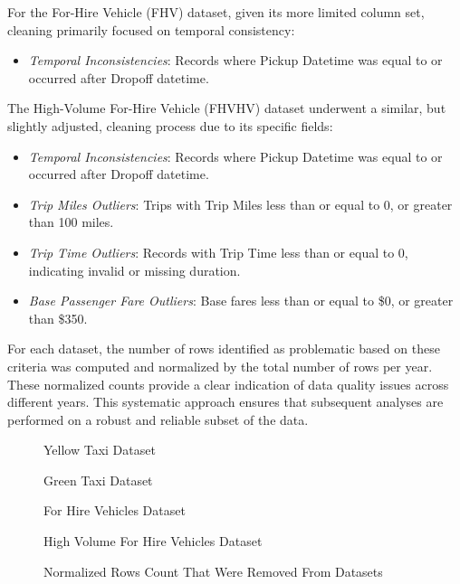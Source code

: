 \documentclass[conference]{IEEEtran}
\begin{document}
For the For-Hire Vehicle (FHV) dataset, given its more limited column set, cleaning primarily focused on temporal consistency:
\begin{itemize}
  \item \emph{Temporal Inconsistencies}: Records where Pickup Datetime was equal to or occurred after Dropoff datetime.
\end{itemize}

The High-Volume For-Hire Vehicle (FHVHV) dataset underwent a similar, but slightly adjusted, cleaning process due to its
specific fields:
\begin{itemize}
  \item \emph{Temporal Inconsistencies}: Records where Pickup Datetime was equal to or occurred after Dropoff datetime.
  \item \emph{Trip Miles Outliers}: Trips with Trip Miles less than or equal to 0, or greater than 100 miles.
  \item \emph{Trip Time Outliers}: Records with Trip Time less than or equal to 0, indicating invalid or missing duration.
  \item \emph{Base Passenger Fare Outliers}: Base fares less than or equal to \$0, or greater than \$350.
\end{itemize}

For each dataset, the number of rows identified as problematic based on these criteria was computed and normalized by
the total number of rows per year. These normalized counts provide a clear indication of data quality issues across
different years. This systematic approach ensures that subsequent analyses are performed on a robust and reliable subset
of the data.

\begin{figure}[htbp]
  \centering
  \begin{minipage}[b]{0.45\linewidth}
    
    \caption{Yellow Taxi Dataset}
  \end{minipage}
  \hfill
  \begin{minipage}[b]{0.45\linewidth}
    
    \caption{Green Taxi Dataset}
  \end{minipage}

  \vspace{1em}

  \begin{minipage}[b]{0.45\linewidth}
    
    \caption{For Hire Vehicles Dataset}
  \end{minipage}
  \hfill
  \begin{minipage}[b]{0.45\linewidth}
    
    \caption{High Volume For Hire Vehicles Dataset}
  \end{minipage}

  \caption{Normalized Rows Count That Were Removed From Datasets}

\end{figure}
\end{document}
